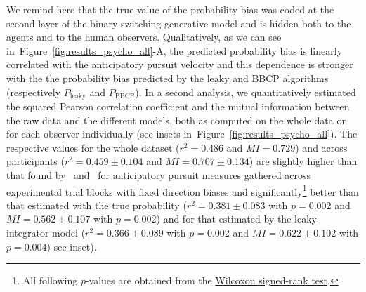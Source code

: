 \documentclass[10pt,letterpaper]{article}
\newcommand{\citet}[1]{\cite{#1}}
\newcommand{\seeFig}[1]{Figure~\ref{fig:#1}}
\begin{document}
We remind here that the true value of the probability bias
was coded at the second layer of the binary switching generative model and
is hidden both to the agents and to the human observers.
%
Qualitatively, as we can see in~\seeFig{results_psycho_all}-A,
the predicted probability bias
is linearly correlated with the anticipatory pursuit velocity
and this dependence is stronger with the
the probability bias predicted by the leaky and BBCP algorithms 
(respectively $P_{\text{leaky}}$ and $P_{\text{BBCP}}$).
In a second analysis, we quantitatively estimated the squared Pearson correlation coefficient
and the mutual information
between the raw data and the different models, both as computed on the whole data or
for each observer individually (see insets in~\seeFig{results_psycho_all}).
The respective values for the whole dataset
($r^{2} = 0.486$ and $MI = 0.729$) and across participants
($r^2 = 0.459 \pm 0.104$ and $MI = 0.707 \pm 0.134$)
are slightly higher than that found by~\citet{Montagnini2010} and~\citet{Damasse18}
for anticipatory pursuit measures gathered across experimental trial blocks with fixed direction biases %
and significantly\footnote{All following $p$-values are obtained from the \href{https://docs.scipy.org/doc/scipy/reference/generated/scipy.stats.wilcoxon.html}{Wilcoxon signed-rank test}.} better than that estimated
with the true probability
($r^{2} = 0.381 \pm 0.083$ with $p=0.002$
and $MI = 0.562 \pm 0.107$ with $p=0.002$)
and for that estimated by the leaky-integrator model
($r^{2} = 0.366 \pm 0.089$ with $p=0.002$ and $MI = 0.622 \pm 0.102$ with $p=0.004$)
see inset).
\end{document}
